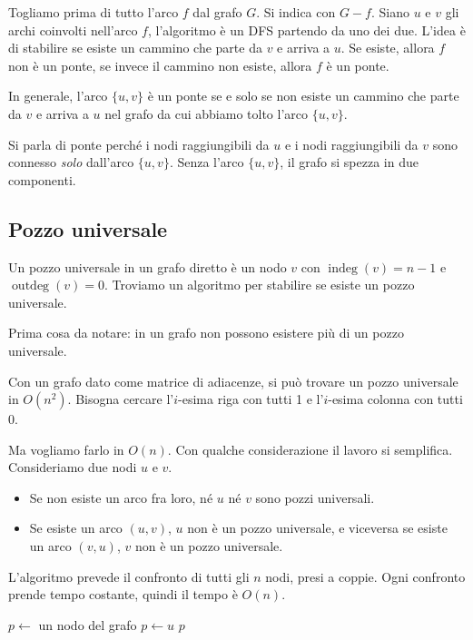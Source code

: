 Togliamo prima di tutto l'arco $f$ dal grafo $G$. Si indica con $G - f$. Siano $u$ e $v$ gli archi coinvolti nell'arco $f$, l'algoritmo \`e un DFS partendo da uno dei due. L'idea \`e di stabilire se esiste un cammino che parte da $v$ e arriva a $u$. Se esiste, allora $f$ non \`e un ponte, se invece il cammino non esiste, allora $f$ \`e un ponte.

In generale, l'arco $\{u,v\}$ \`e un ponte se e solo se non esiste un cammino che parte da $v$ e arriva a $u$ nel grafo da cui abbiamo tolto l'arco $\{u,v\}$.

Si parla di ponte perch\'e i nodi raggiungibili da $u$ e i nodi raggiungibili da $v$ sono connesso \emph{solo} dall'arco $\{u,v\}$. Senza l'arco $\{u,v\}$, il grafo si spezza in due componenti.

\clearpage

\subsection{Pozzo universale}

\begin{esercizio}
Un pozzo universale in un grafo diretto \`e un nodo $v$ con $\operatorname{indeg}(v) = n - 1$ e $\operatorname{outdeg}(v) = 0$. Troviamo un algoritmo per stabilire se esiste un pozzo universale.
\end{esercizio}

Prima cosa da notare: in un grafo non possono esistere pi\`u di un pozzo universale.

Con un grafo dato come matrice di adiacenze, si pu\`o trovare un pozzo universale in $O(n^2)$. Bisogna cercare l'$i$-esima riga con tutti 1 e l'$i$-esima colonna con tutti 0.

Ma vogliamo farlo in $O(n)$. Con qualche considerazione il lavoro si semplifica. Consideriamo due nodi $u$ e $v$.
\begin{itemize}
    \item Se non esiste un arco fra loro, n\'e $u$ n\'e $v$ sono pozzi universali.
    \item Se esiste un arco $(u,v)$, $u$ non \`e un pozzo universale, e viceversa se esiste un arco $(v,u)$, $v$ non \`e un pozzo universale.
\end{itemize}
L'algoritmo prevede il confronto di tutti gli $n$ nodi, presi a coppie. Ogni confronto prende tempo costante, quindi il tempo \`e $O(n)$.

\begin{algorithm}
\caption{Algoritmo per trovare un pozzo universale}
\begin{algorithmic}[1]
    \State $p \gets$ un nodo del grafo
            \State $p \gets u$
        \EndIf
    \EndFor
            \State {}
        \EndIf
    \EndFor
    \State \Return $p$
\EndFunction
\end{algorithmic}
\end{algorithm}

